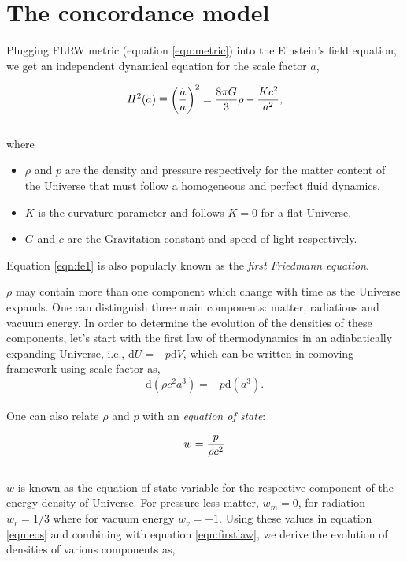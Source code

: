 \section{The concordance model}


Plugging FLRW metric (equation \ref{eqn:metric}) into the Einstein's field equation, 
we get an independent dynamical equation
for the scale factor $a$,

\begin{equation}
\centering
H^2(a) \equiv \left( \dfrac{\dot{a}}{a} \right)^2 = 
			\dfrac{8 \pi G}{3} \rho - \dfrac{Kc^2}{a^2},
\label{eqn:fe1}
\end{equation}
\\
where
\begin{itemize}
\item$\rho$ and $p$ are the density and pressure respectively for the matter content
of the Universe that must follow a homogeneous and perfect fluid dynamics. 
\item $K$ is the curvature parameter and follows $K=0$ for a flat Universe. 
\item $G$ and $c$ are
the Gravitation constant and speed of light respectively. 
\end{itemize}
Equation \ref{eqn:fe1} is 
also popularly known as the {\it first Friedmann equation}.

$\rho$ may contain more than one component which change with time as the Universe 
expands. One can distinguish three main components: matter, radiations and vacuum 
energy. In order to determine the evolution of the densities of these components,
let's start with the first law of thermodynamics in an adiabatically expanding Universe,
i.e., $\mathrm{d}U = -p\mathrm{d}V$, which can be written in comoving framework
using scale factor as,
\begin{equation}
	\mathrm{d}(\rho c^2 a^3) = -p \mathrm{d} (a^3).
	\label{eqn:firstlaw}
\end{equation}
\\
One can also relate $\rho$ and $p$ with an {\it equation of state}:

\begin{equation}
\centering
w = \dfrac{p}{\rho c^2}
\label{eqn:eos}
\end{equation}
\\
$w$ is known as the equation of state variable for the respective component
of the energy density of Universe. For pressure-less matter, $w_m=0$,
for radiation $w_r=1/3$ where for vacuum energy $w_v=-1$. Using these values 
in equation \ref{eqn:eos} and combining with equation \ref{eqn:firstlaw}, we 
derive the evolution of densities of various components as,

